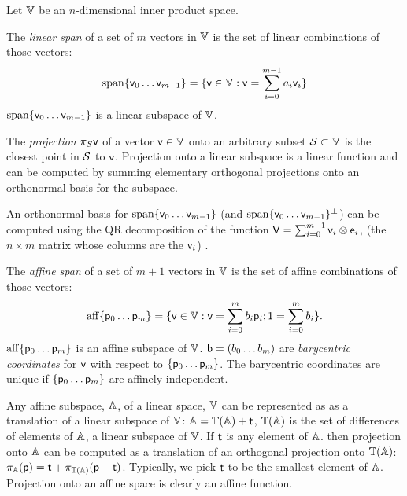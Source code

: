 \label{sec:spans-and-projections}

Let $\mathbb{V}$ be an $n$-dimensional inner product space.

The \textit{linear span} of a set of $m$ vectors in $\mathbb{V}$
is the set of linear combinations of those vectors:
\begin{equation}
\mathrm{span}\{ \mathsf{v}_0 \ldots \mathsf{v}_{m-1} \} = \{\mathsf{v} \in \mathbb{V} : \mathsf{v} = \sum_{i=0}^{m-1} a_i \mathsf{v}_i\}
\end{equation}
$\mathrm{span}\{ \mathsf{v}_0 \ldots \mathsf{v}_{m-1} \}$ is a linear subspace of $\mathbb{V}$.

The \textit{projection} $\pi_{\mathcal{S}} \mathsf{v}$ of a vector $\mathsf{v} \in \mathbb{V}$
onto an arbitrary subset $\mathcal{S} \subset \mathbb{V}$
is the closest point in $\mathcal{S}$ to $\mathsf{v}$.
Projection onto a linear subspace is a linear function and
can be computed by summing
elementary orthogonal projections onto an orthonormal basis for the subspace.

An orthonormal basis for $\mathrm{span}\{ \mathsf{v}_0 \ldots \mathsf{v}_{m-1} \}$
(and $\mathrm{span}\{ \mathsf{v}_0 \ldots \mathsf{v}_{m-1} \}^\perp$)
can be computed using the QR decomposition
of the function $\mathsf{V} = \sum_{i=0}^{m-1} \mathsf{v}_i \otimes \mathsf{e}_i$,
(the $n \times m$ matrix whose columns are the $\mathsf{v}_i$)
\cite[See][sec. 5.2 ]{golub-vanloan-2012}.

The \textit{affine span} of a set of $m+1$ vectors in $\mathbb{V}$
is the set of affine combinations of those vectors:
\begin{equation}
\mathrm{aff}\{ \mathsf{p}_0 \ldots \mathsf{p}_{m} \} = \{\mathsf{v} \in \mathbb{V} : \mathsf{v} = \sum_{i=0}^{m} b_i \mathsf{p}_i;
1 = \sum_{i=0}^{m} b_i \}.
\end{equation}
$\mathrm{aff}\{ \mathsf{p}_0 \ldots \mathsf{p}_{m} \}$ is an affine subspace of $\mathbb{V}$.
$\mathsf{b} = ( b_0 \ldots b_m )$ are \textit{barycentric coordinates}
for $\mathsf{v}$ with respect to $\{ \mathsf{p}_0 \ldots \mathsf{p}_{m} \}$.
The barycentric coordinates are unique if $\{ \mathsf{p}_0 \ldots \mathsf{p}_{m} \}$
are affinely independent.

Any affine subspace, $\mathbb{A}$, of a linear space, $\mathbb{V}$ can be represented as
as a translation of a linear subspace of $\mathbb{V}$:
$\mathbb{A} = \mathbb{T}(\mathbb{A}) + \mathsf{t}$,
$\mathbb{T}(\mathbb{A})$ is the set of differences of elements of $\mathbb{A}$,
a linear subspace of $\mathbb{V}$.
If $\mathsf{t}$ is any element of $\mathbb{A}$.
then projection onto $\mathbb{A}$
can be computed as a translation of an orthogonal projection onto $\mathbb{T}(\mathbb{A})$:
$\pi_{\mathbb{A}} (\mathsf{p}) = \mathsf{t} + \pi_{\mathbb{T}(\mathbb{A})} (\mathsf{p} - \mathsf{t})$.
Typically, we pick $\mathsf{t}$ to be the smallest element of $\mathbb{A}$.
Projection onto an affine space is clearly an affine function.


